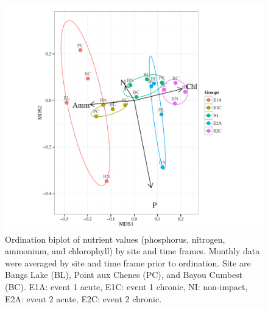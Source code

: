 \documentclass[letterpaper,12pt]{article}\usepackage[]{graphicx}\usepackage[]{color}
\makeatletter
\def\maxwidth{ %
  \ifdim\Gin@nat@width>\linewidth
    \linewidth
  \else
    \Gin@nat@width
  \fi
}
\makeatother
\begin{document}
\clearpage

\begin{figure}[!ht]

{\centering \includegraphics[width=\maxwidth]{figs/ordfig-1} 

}

\caption[Ordination biplot of nutrient values (phosphorus, nitrogen, ammonium, and chlorophyll) by site and time frames]{Ordination biplot of nutrient values (phosphorus, nitrogen, ammonium, and chlorophyll) by site and time frames. Monthly data were averaged by site and time frame prior to ordination.  Site are Bangs Lake (BL), Point aux Chenes (PC), and Bayou Cumbest (BC). E1A: event 1 acute, E1C: event 1 chronic, NI: non-impact, E2A: event 2 acute, E2C: event 2 chronic.}\label{fig:ordfig}
\end{figure}


\clearpage
\end{document}
